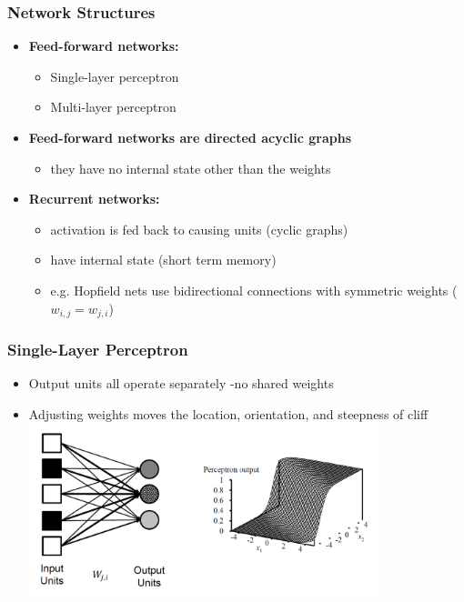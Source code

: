 \documentclass[conference]{styles/acmsiggraph}
\begin{document}
        \subsubsection{Network Structures}
            \begin{itemize}
                \item \textbf{Feed-forward networks:}
                \begin{itemize}
                    \item Single-layer perceptron
                    \item Multi-layer perceptron
                \end{itemize}
                \item \textbf{Feed-forward networks are directed acyclic graphs}
                \begin{itemize}
                    \item they have no internal state other than the weights
                \end{itemize}
                \item \textbf{Recurrent networks:}
                \begin{itemize}
                    \item activation is fed back to causing units (cyclic graphs)
                    \item have internal state (short term memory)
                    \item e.g. Hopfield nets use bidirectional connections with symmetric weights ($w_{i,j} = w_{j,i}$)
                \end{itemize}
            \end{itemize}
        
        \subsubsection{Single-Layer Perceptron}
            \begin{itemize}
                \item Output units all operate separately -no shared weights
                \item Adjusting weights moves the location, orientation, and steepness of cliff\newline
                \includegraphics[width=0.8\textwidth]{imgs/SingleLayerPerceptron.png}
            \end{itemize}
        
\end{document}
